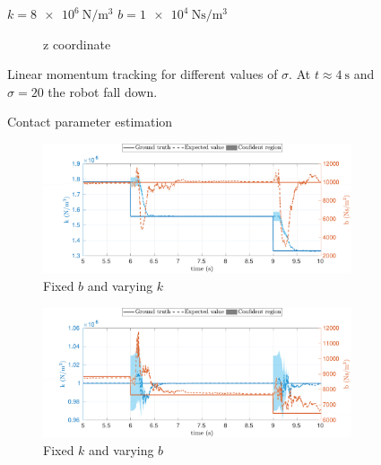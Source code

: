 \begin{figure}[t]
\begin{myframe}{$k = \SI{8e6}{\newton \per \meter^3}$ $b = \SI{1e4}{\newton \second \per \meter^3}$}
\begin{subfigure}[b]{0.49\textwidth}
        \caption{z coordinate}
        \label{fig:noise_linear_momentum_z}
    \end{subfigure}
    \end{myframe}
    \caption{Linear momentum tracking for different values of $\sigma$. At $t\approx\SI{4}{\second}$ and $\sigma = 20$  the robot fall down. \label{fig:noise_linear_momentum}}
\end{figure}

\begin{figure}[!t]
    \begin{myframe}{Contact parameter estimation}
    \centering
        \begin{subfigure}[b]{0.49\textwidth}
        \centering
        \includegraphics[height=0.141\textheight]{chapter_compliant_contact/figures/compliant_spring_varing_rls.pdf}
        \caption{Fixed $b$ and varying $k$}
        \label{fig:compliant_spring_varing_rls}
    \end{subfigure}
    \hfill
    \begin{subfigure}[b]{0.49\textwidth}
        \centering
        \includegraphics[height=0.141\textheight]{chapter_compliant_contact/figures/compliant_damper_varing_rls.pdf}
        \caption{Fixed $k$ and varying $b$}
        \label{fig:compliant_damper_varing_rls}
    \end{subfigure}
     \begin{subfigure}[b]{0.49\textwidth}
        \centering

\end{subfigure}
\end{myframe}
\end{figure}
